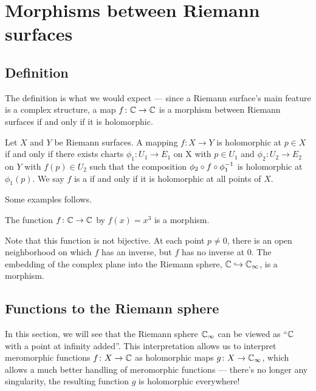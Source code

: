 \chapter{Morphisms between Riemann surfaces}

\section{Definition}

The definition is what we would expect --- since a Riemann surface's main feature is a
complex structure, a map $f \colon \mathbb C \to \mathbb C$ is a morphism between Riemann surfaces
if and only if it is holomorphic.

\begin{definition}
	\label{def:riemann_surface_morphism}
	Let $X$ and $Y$ be Riemann surfaces. A mapping $f \colon X \to Y$ is holomorphic at $p \in X$ if
	and only if there exists charts $\phi_1 \colon U_1 \to E_1$ on X with $p \in U_1$ and $\phi_2
	\colon U_2 \to E_2$ on $Y$ with $f(p) \in U_2$ such that the composition $\phi_2 \circ f \circ
	\phi_1^{-1}$ is holomorphic at $\phi_1(p)$. We say $f$ is a  if and only if it is holomorphic at all points of $X$.
\end{definition}

\begin{example}
	Some examples follows.
	\begin{itemize}
		\ii The function $f \colon \mathbb C \to \mathbb C$ by $f(x) = x^3$ is a morphism.

		Note that this function is not bijective. At each point $p \neq 0$, there is an open
		neighborhood on which $f$ has an inverse, but $f$ has no inverse at $0$.
		\ii The embedding of the complex plane into the Riemann sphere, $\mathbb C \hookrightarrow \mathbb C_\infty$, is
		a morphism.
	\end{itemize}
\end{example}

\section{Functions to the Riemann sphere}

In this section, we will see that the Riemann sphere $\mathbb C_\infty$ can be viewed as ``$\mathbb C$ with a
point at infinity added''. This interpretation allows us to interpret meromorphic functions $f
\colon X \to \mathbb C$ as holomorphic maps $g \colon X \to \mathbb C_\infty$, which allows a much better
handling of meromorphic functions --- there's no longer any singularity, the resulting function
$g$ is holomorphic everywhere!

